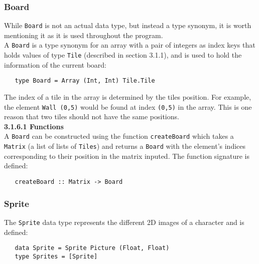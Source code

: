\documentclass{article}
\begin{document}
    	\subsubsection{Board}
		While \texttt{Board} is not an actual data type, but instead a type synonym, it is worth mentioning it as it is used throughout the program. \\
        \newline
        A \texttt{Board} is a type synonym for an array with a pair of integers as index keys that holds values of type \texttt{Tile} (described in section 3.1.1), and is used to hold the information of the current board: \\

   \begin{verbatim}
   type Board = Array (Int, Int) Tile.Tile
   \end{verbatim}

        \noindent The index of a tile in the array is determined by the tiles position. For example, the element \texttt{Wall (0,5)} would be found at index \texttt{(0,5)} in the array. This is one reason that two tiles should not have the same positions. \\
       	\newline
    	\textbf{3.1.6.1 Functions} \\
        \newline
        A \texttt{Board} can be constructed using the function \texttt{createBoard} which takes a \texttt{Matrix} (a list of lists of \texttt{Tiles}) and returns a \texttt{Board} with the element's indices corresponding to their position in the matrix inputed. The function signature is defined: \\

   \begin{verbatim}
   createBoard :: Matrix -> Board
   \end{verbatim}
    	\subsubsection{Sprite}
    	The \texttt{Sprite} data type represents the different 2D images of a character and is defined: \\
   \begin{verbatim}
   data Sprite = Sprite Picture (Float, Float)
   type Sprites = [Sprite]
   \end{verbatim}
\end{document}
